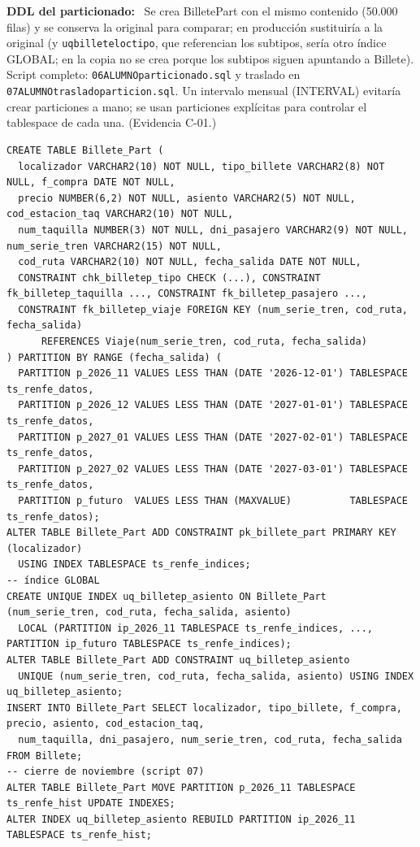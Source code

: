 \documentclass[11pt,a4paper]{article}
\DeclareRobustCommand{\_}{\textunderscore\allowbreak}
\newcommand{\tb}[1]{\texttt{#1}}
\newcommand{\campo}[1]{\textbf{#1:}~}                 %
\begin{document}
\campo{DDL del particionado} Se crea Billete\_Part con el mismo contenido (50.000 filas) y se conserva la original para comparar; en producción sustituiría a la original (y \tb{uq\_billete\_loc\_tipo}, que referencian los subtipos, sería otro índice GLOBAL; en la copia no se crea porque los subtipos siguen apuntando a Billete). Script completo: \tb{06\_ALUMNO\_particionado.sql} y traslado en \tb{07\_ALUMNO\_traslado\_particion.sql}. Un intervalo mensual (INTERVAL) evitaría crear particiones a mano; se usan particiones explícitas para controlar el tablespace de cada una. (Evidencia C-01.)
\begin{lstlisting}
CREATE TABLE Billete_Part (
  localizador VARCHAR2(10) NOT NULL, tipo_billete VARCHAR2(8) NOT NULL, f_compra DATE NOT NULL,
  precio NUMBER(6,2) NOT NULL, asiento VARCHAR2(5) NOT NULL, cod_estacion_taq VARCHAR2(10) NOT NULL,
  num_taquilla NUMBER(3) NOT NULL, dni_pasajero VARCHAR2(9) NOT NULL, num_serie_tren VARCHAR2(15) NOT NULL,
  cod_ruta VARCHAR2(10) NOT NULL, fecha_salida DATE NOT NULL,
  CONSTRAINT chk_billetep_tipo CHECK (...), CONSTRAINT fk_billetep_taquilla ..., CONSTRAINT fk_billetep_pasajero ...,
  CONSTRAINT fk_billetep_viaje FOREIGN KEY (num_serie_tren, cod_ruta, fecha_salida)
      REFERENCES Viaje(num_serie_tren, cod_ruta, fecha_salida)
) PARTITION BY RANGE (fecha_salida) (
  PARTITION p_2026_11 VALUES LESS THAN (DATE '2026-12-01') TABLESPACE ts_renfe_datos,
  PARTITION p_2026_12 VALUES LESS THAN (DATE '2027-01-01') TABLESPACE ts_renfe_datos,
  PARTITION p_2027_01 VALUES LESS THAN (DATE '2027-02-01') TABLESPACE ts_renfe_datos,
  PARTITION p_2027_02 VALUES LESS THAN (DATE '2027-03-01') TABLESPACE ts_renfe_datos,
  PARTITION p_futuro  VALUES LESS THAN (MAXVALUE)          TABLESPACE ts_renfe_datos);
ALTER TABLE Billete_Part ADD CONSTRAINT pk_billete_part PRIMARY KEY (localizador)
  USING INDEX TABLESPACE ts_renfe_indices;                                -- índice GLOBAL
CREATE UNIQUE INDEX uq_billetep_asiento ON Billete_Part (num_serie_tren, cod_ruta, fecha_salida, asiento)
  LOCAL (PARTITION ip_2026_11 TABLESPACE ts_renfe_indices, ..., PARTITION ip_futuro TABLESPACE ts_renfe_indices);
ALTER TABLE Billete_Part ADD CONSTRAINT uq_billetep_asiento
  UNIQUE (num_serie_tren, cod_ruta, fecha_salida, asiento) USING INDEX uq_billetep_asiento;
INSERT INTO Billete_Part SELECT localizador, tipo_billete, f_compra, precio, asiento, cod_estacion_taq,
  num_taquilla, dni_pasajero, num_serie_tren, cod_ruta, fecha_salida FROM Billete;
-- cierre de noviembre (script 07)
ALTER TABLE Billete_Part MOVE PARTITION p_2026_11 TABLESPACE ts_renfe_hist UPDATE INDEXES;
ALTER INDEX uq_billetep_asiento REBUILD PARTITION ip_2026_11 TABLESPACE ts_renfe_hist;
\end{lstlisting}
\end{document}
